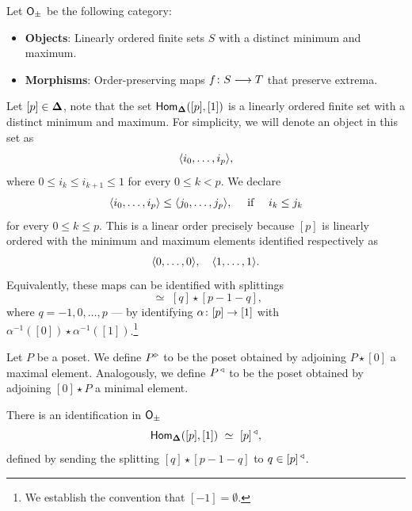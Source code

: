 \begin{definition}\label{ch2:: def: updelta cat}
    Let $\mathsf O_{\pm}$ be the following category:
    \begin{itemize}
        \item \textbf{Objects}: Linearly ordered finite sets $S$ with a distinct minimum and maximum.
        \item \textbf{Morphisms}: Order-preserving maps $f \colon S \longrightarrow T$ that preserve extrema. 
    \end{itemize}
\end{definition}

\begin{remark}
    Let $[p]\in \mathbf\Delta$, note that the set $\operatorname{\sf Hom}_{\mathbf\Delta}([p],[1])$ is a linearly ordered finite set with a distinct minimum and maximum. For simplicity, we will denote an object in this set as 
    \begin{equation}
        \langle i_0, \ldots, i_p \rangle,
    \end{equation}
    where $0 \leq i_{k} \leq i_{k+1} \leq 1$ for every $0\leq k < p$. We declare
    \begin{equation}
    \langle i_0, \ldots, i_p \rangle \leq \langle j_0, \ldots, j_p \rangle, \quad \text{ if } \quad i_k \leq j_k        
    \end{equation}
    for every $0\leq k \leq p$. This is a linear order precisely because $[p]$ is linearly ordered with the minimum and maximum elements identified respectively as
    \begin{equation}
        \langle 0, \ldots, 0\rangle, \quad \langle 1,\ldots, 1 \rangle. 
    \end{equation}
    Equivalently, these maps can be identified with splittings
    \begin{equation}
        [p] \,\, \simeq \,\, [q]\star [p-1-q],
    \end{equation}
    where $q = -1, 0,\ldots, p$ — by identifying $\alpha \colon [p] \rightarrow [1]$ with $\alpha^{-1}([0])\star \alpha^{-1}([1])$.\footnote{We establish the convention that $[-1] = \emptyset$.}
\end{remark}

\begin{notation}
    Let $P$ be a poset. We define $P^{\operatorname{\triangleright}}$ to be the poset obtained by adjoining $P \star [0]$ a maximal element. Analogously, we define $P^{\,\operatorname{\triangleleft}}$ to be the poset obtained by adjoining $[0] \star P$ a minimal element. 
\end{notation}

\begin{observation}
There is an identification in $\mathsf O_{\pm}$
\begin{equation}
\operatorname{\sf Hom}_{\mathbf\Delta}([p],[1]) \,\, \simeq \,\, [p]^{\,\operatorname{\triangleleft}},    
\end{equation}
defined by sending the splitting $[q] \star [p-1-q]$ to $q \in [p]^{\,\operatorname{\triangleleft}}$.
\end{observation}

